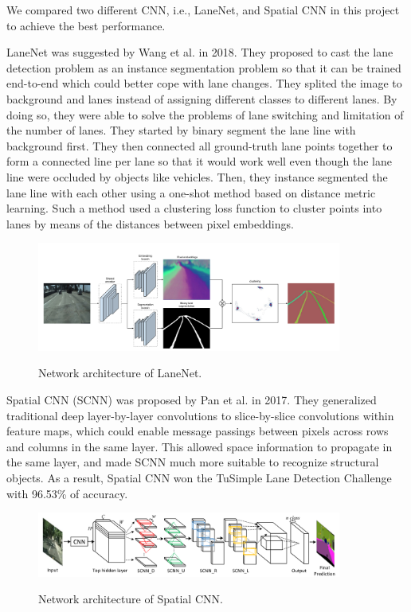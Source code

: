 \documentclass[runningheads]{llncs}
\begin{document}
We compared two different CNN, i.e., LaneNet, and Spatial 
CNN in this project to achieve the best performance. 

LaneNet was suggested by Wang et al.\cite{LaneNet} in 2018. 
They proposed to cast the lane detection problem as an 
instance segmentation problem so that it can be trained 
end-to-end which could better cope with lane changes. 
They splited the image to background and lanes instead of 
assigning different classes to different lanes. By doing so, 
they were able to solve the problems of lane switching and 
limitation of the number of lanes. They started by binary 
segment the lane line with background first. They then 
connected all ground-truth lane points together to form a 
connected line per lane so that it would work well even 
though the lane line were occluded by objects like vehicles. 
Then, they instance segmented the lane line with each other 
using a one-shot method based on distance metric learning. 
Such a method used a clustering loss function to cluster 
points into lanes by means of the distances between pixel 
embeddings.

 
\begin{figure}
    \centering
    \includegraphics[width=10cm]{reference/lanenet}
    \label{fig:LaneNet}
    \caption{Network architecture of LaneNet.\cite{LaneNet}}
\end{figure}

Spatial CNN (SCNN) was proposed by Pan et al.
\cite{SpatialCNN} in 2017. They generalized traditional 
deep layer-by-layer convolutions to slice-by-slice 
convolutions within feature maps, which could enable 
message passings between pixels across rows and columns in 
the same layer. This allowed space information to propagate 
in the same layer, and made SCNN much more suitable to 
recognize structural objects. As a result, Spatial CNN won 
the TuSimple Lane Detection Challenge with 96.53\% of 
accuracy. 

\begin{figure}
    \centering
    \includegraphics[width=10cm]{reference/scnn}
    \label{fig:SCNN}
    \caption{Network architecture of Spatial CNN.\cite{SpatialCNN}}
\end{figure}
\end{document}
